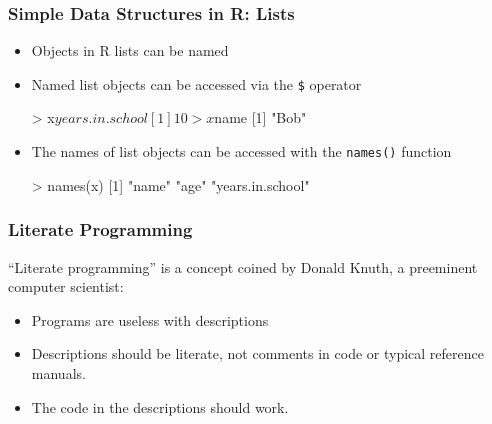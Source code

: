 \documentclass{beamer}
\begin{document}
\begin{frame}[fragile]
  \frametitle{Simple Data Structures in R: Lists}


\begin{itemize}

\item Objects in R lists can be named


\item Named list objects can be accessed via the \texttt{\$} operator

\begin{Rcode}
> x$years.in.school
[1] 10
> x$name
[1] "Bob"
\end{Rcode}

\item The names of list objects can be accessed with the \texttt{names()} function

\begin{Rcode}
> names(x)
[1] "name"  "age"  "years.in.school"
\end{Rcode}

\end{itemize}

\end{frame}

\begin{frame}
  \frametitle{Literate Programming}

``Literate programming'' is a concept coined by Donald Knuth, a preeminent computer scientist:

\begin{itemize}

 \item Programs are useless with descriptions
 \item Descriptions should be literate, not comments in code or typical reference manuals. 
 \item The code in the descriptions should work.
\end{itemize}

\end{frame}
\end{document}
